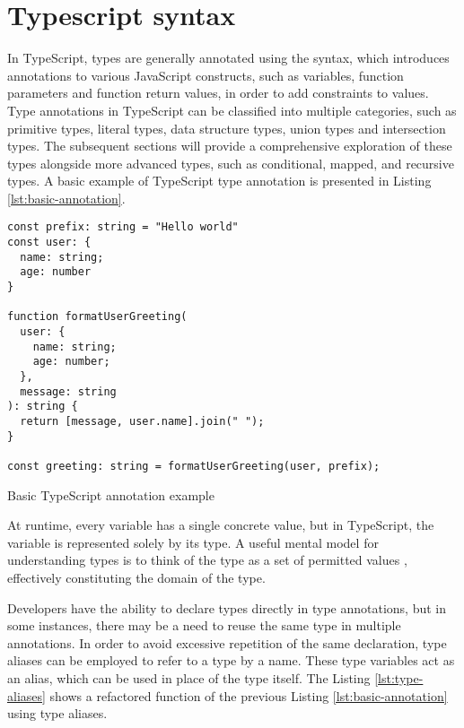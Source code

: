 \section{Typescript syntax}

In TypeScript, types are generally annotated using the  syntax, which introduces annotations to various JavaScript constructs, such as variables, function parameters and function return values, in order to add constraints to values. Type annotations in TypeScript can be classified into multiple categories, such as primitive types, literal types, data structure types, union types and intersection types. The subsequent sections will provide a comprehensive exploration of these types alongside more advanced types, such as conditional, mapped, and recursive types. A basic example of TypeScript type annotation is presented in Listing \ref{lst:basic-annotation}.

\begin{listing}[ht]
  \begin{verbatim}
const prefix: string = "Hello world"
const user: {
  name: string;
  age: number
}

function formatUserGreeting(
  user: {
    name: string;
    age: number;
  }, 
  message: string
): string {
  return [message, user.name].join(" ");
}

const greeting: string = formatUserGreeting(user, prefix); 
\end{verbatim}
  \caption{Basic TypeScript annotation example}\label{lst:basic-annotation}
\end{listing}

At runtime, every variable has a single concrete value, but in TypeScript, the variable is represented solely by its type. A useful mental model for understanding types is to think of the type as a set of permitted values \cite{vanderkamEffectiveTypeScript622019}, effectively constituting the domain of the type.

Developers have the ability to declare types directly in type annotations, but in some instances, there may be a need to reuse the same type in multiple annotations. In order to avoid excessive repetition of the same declaration, type aliases can be employed to refer to a type by a name. These type variables act as an alias, which can be used in place of the type itself. The Listing \ref{lst:type-aliases} shows a refactored  function of the previous Listing \ref{lst:basic-annotation} using type aliases.

